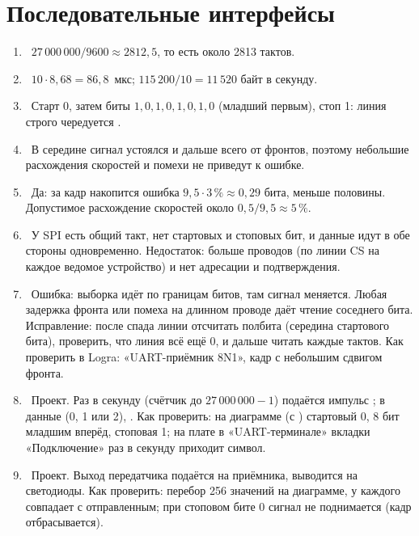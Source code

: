 \section*{Последовательные интерфейсы}
\begin{enumerate}
  \item {}~$27\,000\,000/9600 \approx 2812{,}5$, то есть около 2813 тактов.
  \item {}~$10\cdot 8{,}68 = 86{,}8$~мкс; $115\,200/10 = 11\,520$ байт в секунду.
  \item {}~Старт 0, затем биты $1,0,1,0,1,0,1,0$ (младший первым), стоп 1: линия строго чередуется .
  \item {}~В середине сигнал устоялся и дальше всего от фронтов, поэтому небольшие расхождения скоростей и помехи не приведут к ошибке.
  \item {}~Да: за кадр накопится ошибка $9{,}5\cdot 3\,\% \approx 0{,}29$ бита, меньше половины. Допустимое расхождение скоростей около $0{,}5/9{,}5\approx 5\,\%$.
  \item {}~У SPI есть общий такт, нет стартовых и стоповых бит, и данные идут в обе стороны одновременно. Недостаток: больше проводов (по линии CS на каждое ведомое устройство) и нет адресации и подтверждения.
  \item {}~Ошибка: выборка идёт по границам битов, там сигнал меняется. Любая задержка фронта или помеха на длинном проводе даёт чтение соседнего бита. Исправление: после спада линии отсчитать полбита (середина стартового бита), проверить, что линия всё ещё 0, и дальше читать каждые  тактов. Как проверить в Logra: «UART-приёмник 8N1», кадр  с небольшим сдвигом фронта.
  \item {}~Проект. Раз в секунду (счётчик до $27\,000\,000-1$) подаётся импульс ; в  данные  (0, 1 или 2), . Как проверить: на диаграмме (с ) стартовый 0, 8 бит младшим вперёд, стоповая 1; на плате в «UART-терминале» вкладки «Подключение» раз в секунду приходит символ.
  \item {}~Проект. Выход  передатчика подаётся на  приёмника,  выводится на светодиоды. Как проверить: перебор 256 значений на диаграмме, у каждого  совпадает с отправленным; при стоповом бите 0 сигнал  не поднимается (кадр отбрасывается).
\end{enumerate}


